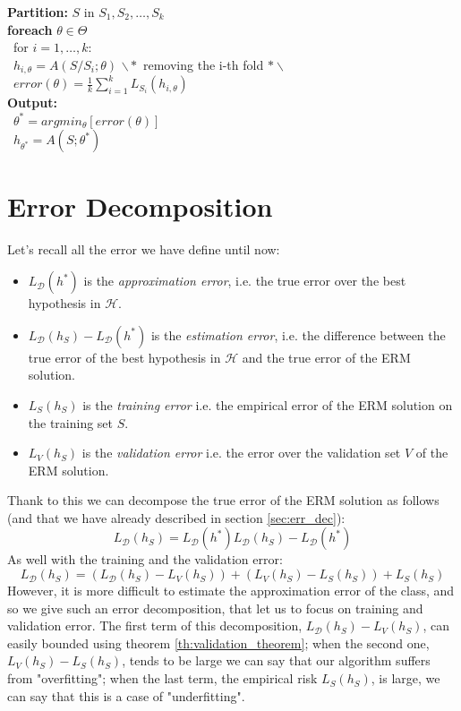 \documentclass[12pt]{report}
\theoremstyle{plain}
\newcommand\mcl[1]{\mathcal{#1}}
\begin{document}
\begin{flushleft}
\begin{tcolorbox}
	\textbf{Partition:} $S$ in $S_1,S_2,\dots,S_k$\\
	
	\textbf{foreach} $\theta\in\Theta$\\
	\-\ for $i=1,\dots,k:$\\
	\-\ \quad $h_{i,\theta}=A(S/S_i;\theta)$ \qquad\qquad $\backslash*$ 
	removing the i-th fold $*\backslash$\\
	\-\ $error(\theta) = \frac{1}{k}\sum_{i=1}^k L_{S_i}(h_{i,\theta})$\\
	
	\textbf{Output:}\\
	\-\ $\theta^* = argmin_\theta\left[error(\theta)\right]$\\
	\-\ $h_{\theta^*} = A(S;\theta^*)$
\label{box:k_fold}
\end{tcolorbox}

\section*{Error Decomposition}
Let's recall all the error we have define until now:
\begin{itemize}
	\item $L_\mcl{D}(h^*)$ is the \textit{approximation error}, i.e. the true 
	error over the best hypothesis in $\mcl{H}$.
	\item $L_\mcl{D}(h_S)-L_\mcl{D}(h^*)$ is the \textit{estimation error}, 
	i.e. the difference between the true error of the best hypothesis in 
	$\mcl{H}$ and the true error of the ERM solution.
	\item $L_S(h_S)$ is the \textit{training error} i.e. the empirical error of 
	the ERM solution on the training set $S$.
	\item $L_V(h_S)$ is the \textit{validation error} i.e. the error over the 
	validation set $V$ of the ERM solution.
\end{itemize}
Thank to this we can decompose the true error of the ERM solution as follows 
(and that we have already described in section \ref{sec:err_dec}):
\[ L_\mcl{D}(h_S) = L_\mcl{D}(h^*) L_\mcl{D}(h_S)-L_\mcl{D}(h^*) \]
As well with the training and the validation error:
\[ L_\mcl{D}(h_S) = (L_\mcl{D}(h_S)-L_V(h_S)) + (L_V(h_S)-L_S(h_S)) + L_S(h_S) 
\]
However, it is more difficult to estimate the approximation error of the class, 
and so we give such an error decomposition, that let us to focus on training 
and validation error. The first term of this decomposition, 
$L_\mcl{D}(h_S)-L_V(h_S)$, can easily bounded using theorem 
\ref{th:validation_theorem}; when the second one, $L_V(h_S)-L_S(h_S)$, tends to 
be large we can say that our algorithm suffers from "overfitting"; when the 
last term, the empirical risk $L_S(h_S)$, is large, we can say that this is a 
case of "underfitting". 



\end{flushleft}
\end{document}
